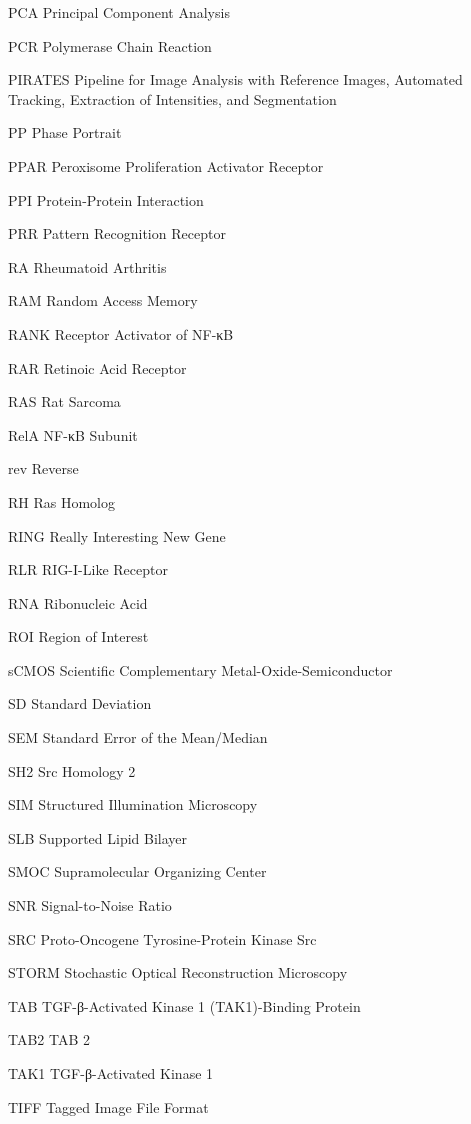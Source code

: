 \begin{spacing}{0.75}
\begin{abbreviations}
\item[PCA] Principal Component Analysis
\item[PCR] Polymerase Chain Reaction
\item[PIRATES] Pipeline for Image Analysis with Reference Images, Automated Tracking, Extraction of Intensities, and Segmentation
\item[PP] Phase Portrait
\item[PPAR] Peroxisome Proliferation Activator Receptor
\item[PPI] Protein-Protein Interaction
\item[PRR] Pattern Recognition Receptor
\item[RA] Rheumatoid Arthritis
\item[RAM] Random Access Memory
\item[RANK] Receptor Activator of NF-κB
\item[RAR] Retinoic Acid Receptor
\item[RAS] Rat Sarcoma
\item[RelA] NF-κB Subunit
\item[rev] Reverse
\item[RH] Ras Homolog
\item[RING] Really Interesting New Gene
\item[RLR] RIG-I-Like Receptor
\item[RNA] Ribonucleic Acid
\item[ROI] Region of Interest
\item[sCMOS] Scientific Complementary Metal-Oxide-Semiconductor
\item[SD] Standard Deviation
\item[SEM] Standard Error of the Mean/Median
\item[SH2] Src Homology 2
\item[SIM] Structured Illumination Microscopy
\item[SLB] Supported Lipid Bilayer
\item[SMOC] Supramolecular Organizing Center
\item[SNR] Signal-to-Noise Ratio
\item[SRC] Proto-Oncogene Tyrosine-Protein Kinase Src
\item[STORM] Stochastic Optical Reconstruction Microscopy
\item[TAB] TGF-β-Activated Kinase 1 (TAK1)-Binding Protein
\item[TAB2] TAB 2
\item[TAK1] TGF-β-Activated Kinase 1
\item[TIFF] Tagged Image File Format

\end{abbreviations}
\end{spacing}
